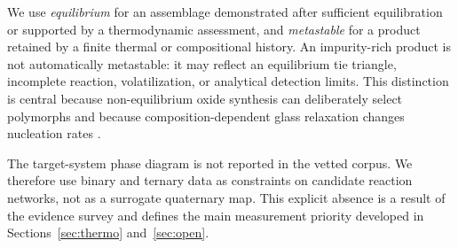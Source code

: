 We use \emph{equilibrium} for an assemblage demonstrated after sufficient equilibration or supported by a thermodynamic assessment, and \emph{metastable} for a product retained by a finite thermal or compositional history. An impurity-rich product is not automatically metastable: it may reflect an equilibrium tie triangle, incomplete reaction, volatilization, or analytical detection limits. This distinction is central because non-equilibrium oxide synthesis can deliberately select polymorphs and because composition-dependent glass relaxation changes nucleation rates \cite{pitcher2024non,zeng2024selective,moulton2022a,kirchner2022beyond}.

The target-system phase diagram is not reported in the vetted corpus. We therefore use binary and ternary data as constraints on candidate reaction networks, not as a surrogate quaternary map. This explicit absence is a result of the evidence survey and defines the main measurement priority developed in Sections~\ref{sec:thermo} and~\ref{sec:open}.
